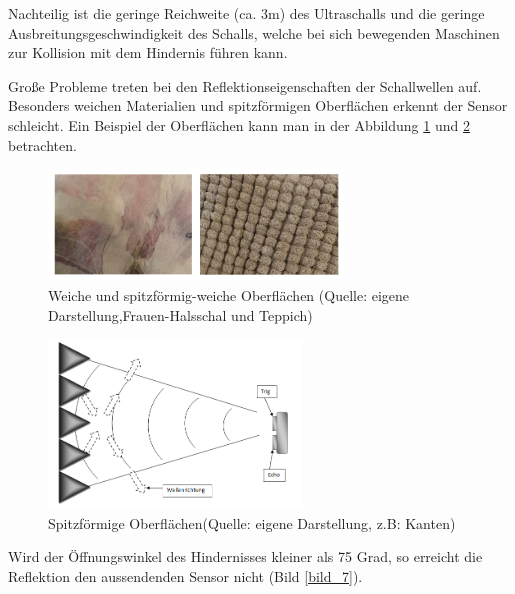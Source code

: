 Nachteilig ist die geringe Reichweite (ca. 3m) des Ultraschalls und  die geringe Ausbreitungsgeschwindigkeit des Schalls, welche bei sich bewegenden Maschinen zur Kollision mit dem Hindernis führen kann.

Große Probleme treten bei den Reflektionseigenschaften der Schallwellen auf. Besonders weichen Materialien und spitzförmigen Oberflächen erkennt  der Sensor schleicht. Ein Beispiel der Oberflächen kann man in der Abbildung \ref{bild_4} und \ref{bild_6} betrachten.

\begin{figure}[!h]  %
	\centering\includegraphics[width=0.7\textwidth]{images/Bild-4-5.png}
	\caption{Weiche und spitzförmig-weiche Oberflächen \newline(Quelle: eigene Darstellung,Frauen-Halsschal und Teppich)}
	\label{bild_4}
\end{figure}
\begin{figure}[!h]  %
	\centering\includegraphics[width=0.6\textwidth]{images/Bild-6.png}
	\caption{Spitzförmige Oberflächen\newline(Quelle: eigene Darstellung, z.B: Kanten)}
	\label{bild_6}
\end{figure}

Wird der Öffnungswinkel des Hindernisses kleiner als 75 Grad, so erreicht die Reflektion den aussendenden Sensor nicht (Bild \ref{bild_7}). 

